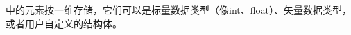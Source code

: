 \startbuffer[sectitlebufobj]
\stopbuffer
\section{\getbuffer[sectitlebufobj]}

中的元素按一维存储，它们可以是标量数据类型（像int、float）、矢量数据类型，或者用户自定义的结构体。




